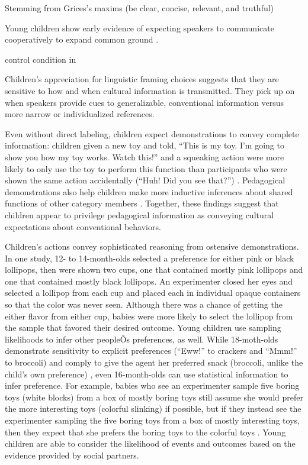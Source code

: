 Stemming from Grices's maxims (be clear, concise, relevant, and truthful) \cite{grice1975}

Young children show early evidence of expecting speakers to communicate cooperatively to expand common ground \cite{clark1996}.  

control condition in 


Children's appreciation for linguistic framing choices suggests that they are sensitive to how and when cultural information is transmitted.  They pick up on when speakers provide cues to generalizable, conventional information versus more narrow or individualized references. 

Even without direct labeling, children expect demonstrations to convey complete information: children given a new toy and told, ``This is my toy. I'm going to show you how my toy works. Watch this!'' and a squeaking action were more likely to only use the toy to perform this function than participants who were shown the same action accidentally (``Huh! Did you see that?'') \cite{bonawitz2011}.  Pedagogical demonstrations also help children make more inductive inferences about shared functions of other category members \cite{butler2012, butler2014}.  Together, these findings suggest that children appear to privilege pedagogical information as conveying cultural expectations about conventional behaviors. 

Children's actions convey sophisticated reasoning from ostensive demonstrations.  In one study, 12- to 14-month-olds selected a preference for either pink or black lollipops, then were shown two cups, one that contained mostly pink lollipops and one that contained mostly black lollipops.  An experimenter closed her eyes and selected a lollipop from each cup and placed each in individual opaque containers so that the color was never seen.  Although there was a chance of getting the either flavor from either cup, babies were more likely to select the lollipop from the sample that favored their desired outcome. Young children use sampling likelihoods to infer other peopleÕs preferences, as well.  While 18-moth-olds demonstrate sensitivity to explicit preferences (``Eww!'' to crackers and ``Mmm!'' to broccoli) and comply to give the agent her preferred snack (broccoli, unlike the child's own preference) \cite{repacholi1997}, even 16-month-olds can use statistical information to infer preference. For example, babies who see an experimenter sample five boring toys (white blocks) from a box of mostly boring toys still assume she would prefer the more interesting toys (colorful slinking) if possible, but if they instead see the experimenter sampling the five boring toys from a box of mostly interesting toys, then they expect that she prefers the boring toys to the colorful toys \cite{ma2011}.  Young children are able to consider the likelihood of events and outcomes based on the evidence provided by social partners. 

